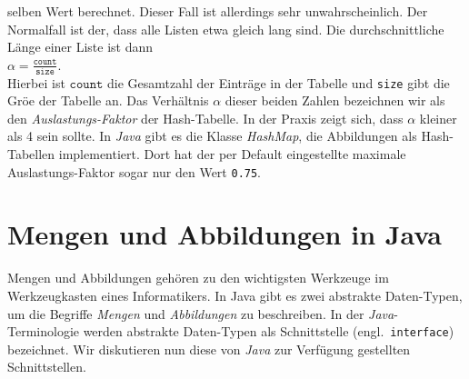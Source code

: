selben Wert berechnet.  Dieser Fall ist allerdings sehr unwahrscheinlich.  Der Normalfall
ist der, dass alle Listen etwa gleich lang sind.  Die durchschnittliche L\"ange  einer Liste
ist dann \\[0.2cm]
\hspace*{1.3cm} $\alpha = \displaystyle \frac{\mathtt{count}}{\mathtt{size}}$. \\[0.2cm]
Hierbei ist $\mathtt{count}$ die Gesamtzahl der Eintr\"age in der Tabelle und \texttt{size}
gibt die Gr\"o\3e der Tabelle an.  Das Verh\"altnis $\alpha$ dieser beiden Zahlen bezeichnen wir 
als den \emph{Auslastungs-Faktor} der Hash-Tabelle.  In der Praxis zeigt sich, dass
$\alpha$ kleiner als 4 sein sollte.  In \textsl{Java} gibt es die Klasse \textsl{HashMap},
die Abbildungen als Hash-Tabellen implementiert.  Dort hat der per Default eingestellte maximale
Auslastungs-Faktor sogar nur den Wert \texttt{0.75}.

\pagebreak
\section{Mengen und Abbildungen in Java}
Mengen und Abbildungen geh\"oren zu den wichtigsten Werkzeuge im Werkzeugkasten eines
Informatikers.  In Java gibt es zwei abstrakte Daten-Typen, um die Begriffe \emph{Mengen}
und \emph{Abbildungen} zu beschreiben. 
In der \textsl{Java}-Terminologie werden abstrakte Daten-Typen als Schnittstelle
(engl.~\texttt{interface}) bezeichnet.  Wir diskutieren nun diese von \textsl{Java} zur
Verf\"ugung gestellten Schnittstellen.

